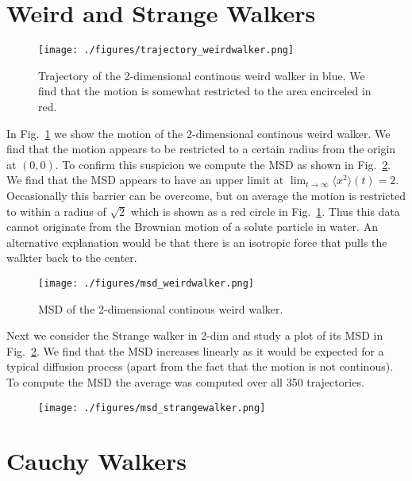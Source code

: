 \documentclass[12pt]{article}
\begin{document}
{\section{Weird and Strange Walkers}

\begin{figure}[H]
  \centering
    \texttt{[image: ./figures/trajectory\_weirdwalker.png]}
    \caption{Trajectory of the 2-dimensional continous weird walker in blue. We find that the 
            motion is somewhat restricted to the area encirceled in red.}
    \label{fig:abb3}
  \end{figure}
In Fig.~\ref{fig:abb3} we show the motion of the 2-dimensional continous weird walker.
We find that the motion appears to be restricted to a certain radius from the origin at $(0,0)$.
To confirm this suspicion we compute the MSD as shown in Fig.~\ref{fig:abb4}. We find that the 
MSD appears to have an upper limit at $\lim_{t \rightarrow \infty} \langle x^2 \rangle (t) = 2$.
Occasionally this barrier can be overcome, but on average the motion is restricted to within a
radius of $\sqrt{2}$ which is shown as a red circle in Fig.~\ref{fig:abb3}. Thus this data cannot
originate from the Brownian motion of a solute particle in water. An alternative explanation would be that
there is an isotropic force that pulls the walkter back to the center.


\begin{figure}[H]
  \centering
    \texttt{[image: ./figures/msd\_weirdwalker.png]}
    \caption{MSD of the 2-dimensional continous weird walker.}
    \label{fig:abb4}
  \end{figure}


Next we consider the Strange walker in 2-dim and study a plot of its MSD in Fig.~\ref{fig:abb4}. We find
that the MSD increases linearly as it would be expected for a typical diffusion process (apart from the fact
that the motion is not continous). To compute the MSD the average was computed over all 350 trajectories.

\begin{figure}[H]
  \centering
    \texttt{[image: ./figures/msd\_strangewalker.png]}
    \label{fig:abb5}
  \end{figure}


\section{Cauchy Walkers}

}
\end{document}
